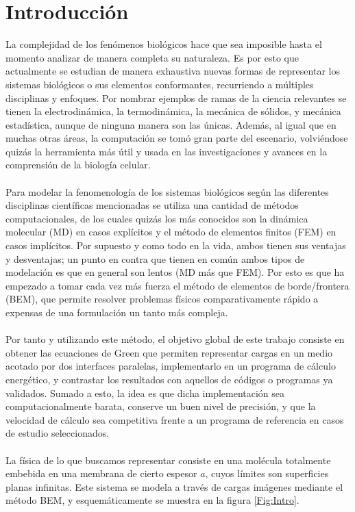 \documentclass[12pt, twoside, onehalfspace, numbers, spanish]{ezthesis}
\numberwithin{equation}{section}
\begin{document}
\chapter{Introducción}\label{Chap:Intro}
La complejidad de los fenómenos biológicos hace que sea imposible hasta el momento analizar de manera completa su naturaleza. Es por esto que actualmente se estudian de manera exhaustiva nuevas formas de representar los sistemas biológicos o sus elementos conformantes, recurriendo a múltiples disciplinas y enfoques. Por nombrar ejemplos de ramas de la ciencia relevantes se tienen la electrodinámica, la termodinámica, la mecánica de sólidos, y mecánica estadística, aunque de ninguna manera son las únicas. Además, al igual que en muchas otras áreas, la computación se tomó gran parte del escenario, volviéndose quizás la herramienta más útil y usada en las investigaciones y avances en la comprensión de la biología celular.\\\\
Para modelar la fenomenología de los sistemas biológicos según las diferentes disciplinas científicas mencionadas se utiliza una cantidad de métodos computacionales, de los cuales quizás los más conocidos son la dinámica molecular (MD) en casos explícitos y el método de elementos finitos (FEM) en casos implícitos. Por supuesto y como todo en la vida, ambos tienen sus ventajas y desventajas; un punto en contra que tienen en común ambos tipos de modelación es que en general son lentos (MD más que FEM). Por esto es que ha empezado a tomar cada vez más fuerza el método de elementos de borde/frontera (BEM), que permite resolver problemas físicos comparativamente rápido a expensas de una formulación un tanto más compleja.\\\\
Por tanto y utilizando este método, el objetivo global de este trabajo consiste en obtener las ecuaciones de Green que permiten representar cargas en un medio acotado por dos interfaces paralelas, implementarlo en un programa de cálculo energético, y contrastar los resultados con aquellos de códigos o programas ya validados. Sumado a esto, la idea es que dicha implementación sea computacionalmente barata, conserve un buen nivel de precisión, y que la velocidad de cálculo sea competitiva frente a un programa de referencia en casos de estudio seleccionados.\\\\
La física de lo que buscamos representar consiste en una molécula totalmente embebida en una membrana de cierto espesor $a$, cuyos límites son superficies planas infinitas. Este sistema se modela a través de cargas imágenes mediante el método BEM, y esquemáticamente se muestra en la figura \ref{Fig:Intro}.
\end{document}
